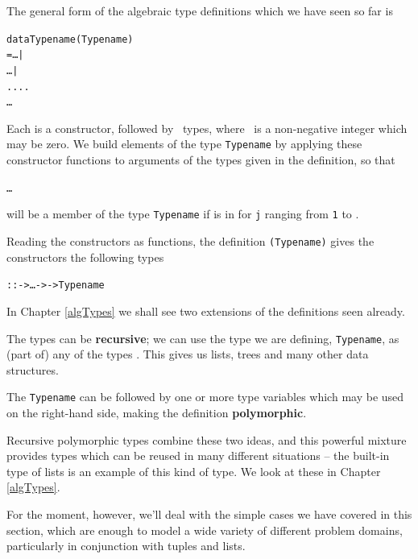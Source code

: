 The general form of the algebraic type definitions which we have seen so far is
\begin{alltt}
data Typename \hfill (Typename)
  =   \ldots {} | 
      \ldots {} | 
        ....
      \ldots {}   
\end{alltt}
Each \texttt{} is a constructor, followed by 
\ types, where \ is a non-negative integer which may
be zero. We build elements of the type \texttt{Typename} by applying these constructor
functions to arguments of the types given in the definition, so that
\begin{alltt}
  \ldots {}
\end{alltt}
will be a member of the type \texttt{Typename} if  is 
in  for \texttt{j} ranging from \texttt{1} to . 

Reading the constructors as functions, the 
definition \texttt{(Typename)} gives the constructors the following
types
\begin{alltt}
 ::  -> \ldots ->  -> Typename
\end{alltt}
In Chapter \ref{algTypes} we shall see two
extensions of the definitions seen already. 
\begin{titemize}
\item The types can be \textbf{recursive};
we can use the type we are defining,
\texttt{Typename}, as (part of) any of the types . This gives us
lists, trees and many other data structures.
\item The \texttt{Typename} can be followed by one or more type
variables which may be used on the right-hand side, making the definition
\textbf{polymorphic}. 
\end{titemize}
Recursive polymorphic types combine these two ideas, and this powerful
mixture provides types which can be reused in many different situations --
the built-in type of lists is an example of this kind of type. We look at these in Chapter \ref{algTypes}.

For the moment, however, we'll deal with the simple cases we have covered in this section, which are enough to model a wide variety of different problem domains, particularly in conjunction with tuples and lists.

